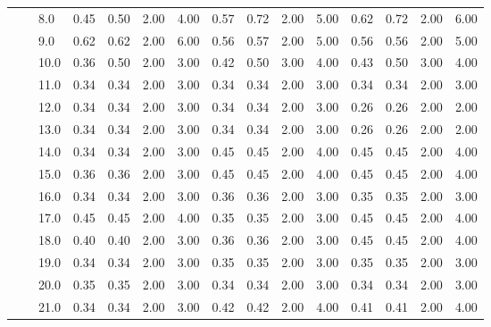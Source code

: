 \begin{tabular}{lllrrrrrrrrrrrr}
       &     & 8.0  &       0.45 &      0.50 & 2.00 &   4.00 &       0.57 &      0.72 & 2.00 &   5.00 &       0.62 &      0.72 & 2.00 &   6.00 \\
       &     & 9.0  &       0.62 &      0.62 & 2.00 &   6.00 &       0.56 &      0.57 & 2.00 &   5.00 &       0.56 &      0.56 & 2.00 &   5.00 \\
       &     & 10.0 &       0.36 &      0.50 & 2.00 &   3.00 &       0.42 &      0.50 & 3.00 &   4.00 &       0.43 &      0.50 & 3.00 &   4.00 \\
       &     & 11.0 &       0.34 &      0.34 & 2.00 &   3.00 &       0.34 &      0.34 & 2.00 &   3.00 &       0.34 &      0.34 & 2.00 &   3.00 \\
       &     & 12.0 &       0.34 &      0.34 & 2.00 &   3.00 &       0.34 &      0.34 & 2.00 &   3.00 &       0.26 &      0.26 & 2.00 &   2.00 \\
       &     & 13.0 &       0.34 &      0.34 & 2.00 &   3.00 &       0.34 &      0.34 & 2.00 &   3.00 &       0.26 &      0.26 & 2.00 &   2.00 \\
       &     & 14.0 &       0.34 &      0.34 & 2.00 &   3.00 &       0.45 &      0.45 & 2.00 &   4.00 &       0.45 &      0.45 & 2.00 &   4.00 \\
       &     & 15.0 &       0.36 &      0.36 & 2.00 &   3.00 &       0.45 &      0.45 & 2.00 &   4.00 &       0.45 &      0.45 & 2.00 &   4.00 \\
       &     & 16.0 &       0.34 &      0.34 & 2.00 &   3.00 &       0.36 &      0.36 & 2.00 &   3.00 &       0.35 &      0.35 & 2.00 &   3.00 \\
       &     & 17.0 &       0.45 &      0.45 & 2.00 &   4.00 &       0.35 &      0.35 & 2.00 &   3.00 &       0.45 &      0.45 & 2.00 &   4.00 \\
       &     & 18.0 &       0.40 &      0.40 & 2.00 &   3.00 &       0.36 &      0.36 & 2.00 &   3.00 &       0.45 &      0.45 & 2.00 &   4.00 \\
       &     & 19.0 &       0.34 &      0.34 & 2.00 &   3.00 &       0.35 &      0.35 & 2.00 &   3.00 &       0.35 &      0.35 & 2.00 &   3.00 \\
       &     & 20.0 &       0.35 &      0.35 & 2.00 &   3.00 &       0.34 &      0.34 & 2.00 &   3.00 &       0.34 &      0.34 & 2.00 &   3.00 \\
       &     & 21.0 &       0.34 &      0.34 & 2.00 &   3.00 &       0.42 &      0.42 & 2.00 &   4.00 &       0.41 &      0.41 & 2.00 &   4.00 \\

\end{tabular}
